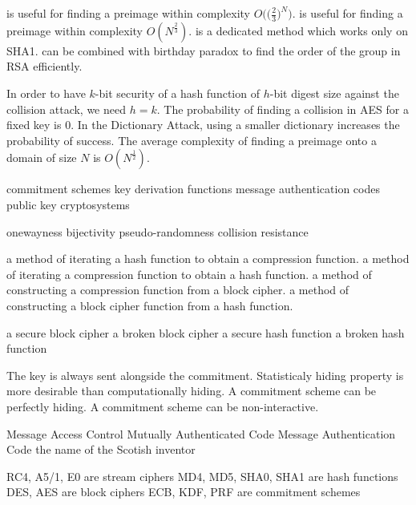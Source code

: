 {is useful for finding a preimage within complexity $O\big(\big({\frac{2}{3}}\big)^N\big).$}
{is useful for finding a preimage within complexity $O(N^{\frac{2}{3}}).$}
{is a dedicated method which works only on SHA1.}
{can be combined with birthday paradox to find the order of the group in RSA efficiently.}


{In order to have $k$-bit security of a hash function of $h$-bit digest size against the collision attack, we need $h=k$.}
{The probability of finding a collision in AES for a fixed key is 0.}
{In the Dictionary Attack, using a smaller dictionary increases the probability of success.}
{The average complexity of finding a preimage onto a domain of size $N$ is $O(N^{\frac{1}{2}})$.}

{commitment schemes}
{key derivation functions}
{message authentication codes}
{public key cryptosystems}

{onewayness}
{bijectivity}
{pseudo-randomness}
{collision resistance}

{a method of iterating a hash function to obtain a compression function.}
{a method of iterating a compression function to obtain a hash function.}
{a method of constructing a compression function from a block cipher.}
{a method of constructing a block cipher function from a hash function.}

 {a secure block cipher}
 {a broken block cipher}
 {a secure hash function}
 {a broken hash function}
 
 

 {The key is always sent alongside the commitment.}
 {Statisticaly hiding property is more desirable than computationally hiding.}
 {A commitment scheme can be perfectly hiding.}
 {A commitment scheme can be non-interactive.}
 
 {Message Access Control}
 {Mutually Authenticated Code}
 {Message Authentication Code}
 {the name of the Scotish inventor}
 
 {RC4, A5/1, E0 are stream ciphers}
 {MD4, MD5, SHA0, SHA1 are hash functions}
 {DES, AES are block ciphers}
 {ECB, KDF, PRF are commitment schemes}

